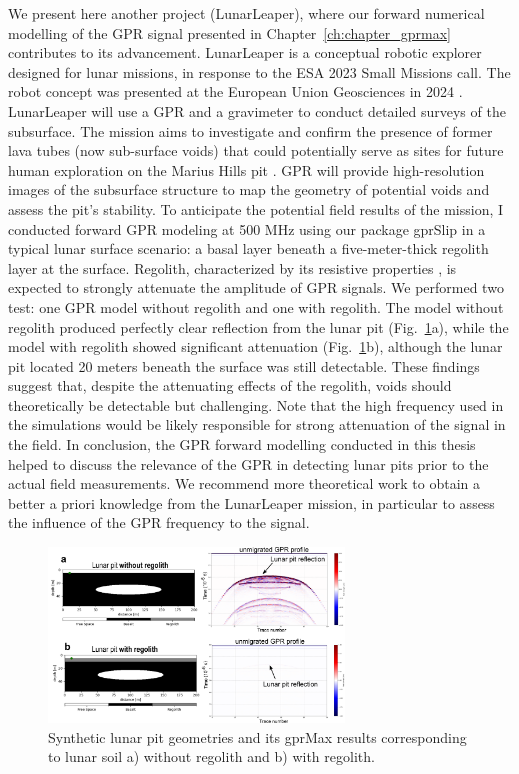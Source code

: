 We present here another project (LunarLeaper), where our forward numerical modelling of the GPR signal presented in Chapter~\ref{ch:chapter_gprmax} contributes to its advancement. LunarLeaper is a conceptual robotic explorer designed for lunar missions, in response to the ESA 2023 Small Missions call. The robot concept was presented at the European Union Geosciences in 2024 \citep{Mittelholz&al2024}. LunarLeaper will use a GPR and a gravimeter to conduct detailed surveys of the subsurface. The mission aims to investigate and confirm the presence of former lava tubes (now sub-surface voids) that could potentially serve as sites for future human exploration on the Marius Hills pit \citep{Wagner&al2014,Sauro&al2020}. GPR will provide high-resolution images of the subsurface structure to map the geometry of potential voids and assess the pit's stability. 
%
To anticipate the potential field results of the mission, I conducted forward GPR modeling at 500 MHz using our package gprSlip in a typical lunar surface scenario: a basal layer beneath a five-meter-thick regolith layer at the surface. Regolith, characterized by its resistive properties \citep{Ding&al2022}, is expected to strongly attenuate the amplitude of GPR signals. We performed two test: one GPR model without regolith and one with regolith. The model without regolith produced perfectly clear reflection from the lunar pit (Fig.~\ref{fig:lunar_pit}a), while the model with regolith showed significant attenuation (Fig.~\ref{fig:lunar_pit}b), although the lunar pit located 20 meters beneath the surface was still detectable. These findings suggest that, despite the attenuating effects of the regolith, voids should theoretically be detectable but challenging. Note that the high frequency used in the simulations would be likely responsible for strong attenuation of the signal in the field. In conclusion, the GPR forward modelling conducted in this thesis helped to discuss the relevance of the GPR in detecting lunar pits prior to the actual field measurements. We recommend more theoretical work to obtain a better a priori knowledge from the LunarLeaper mission, in particular to assess the influence of the GPR frequency to the signal.  


\begin{figure}[h]
    \centering
    \includegraphics[width=0.7\textwidth]{chapters/Discussion/lunar_pit.pdf}
    \caption{Synthetic lunar pit geometries and its gprMax results corresponding to lunar soil a) without regolith and b) with regolith.}
    \label{fig:lunar_pit}
\end{figure}


